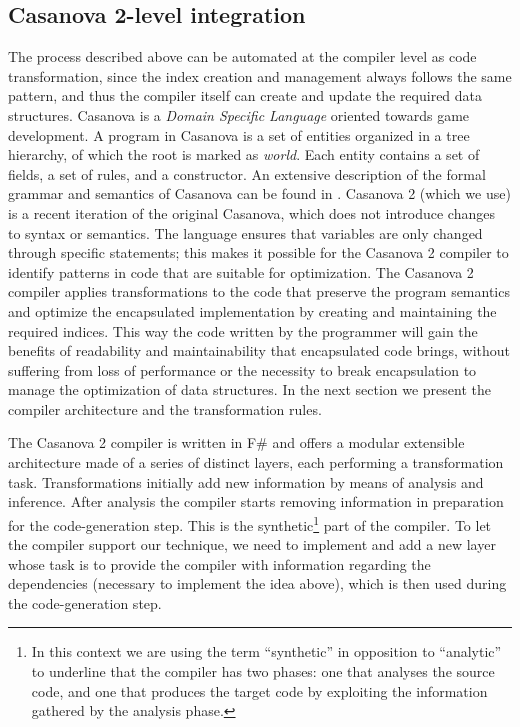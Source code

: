 \subsection{Casanova 2-level integration}

The process described above can be automated at the compiler level as code transformation, since the index creation and management always follows the same pattern, and thus the compiler itself can create and update the required data structures.
Casanova is a \textit{Domain Specific Language} oriented towards game development. A program in Casanova is a set of entities organized in a tree hierarchy, of which the root is marked as \textit{world}. Each entity contains a set of fields, a set of rules, and a constructor. An extensive description of the formal grammar and semantics of Casanova can be found in \cite{maggiore2013casanova}. Casanova 2 (which we use) is a recent iteration of the original Casanova, which does not introduce changes to syntax or semantics. The language ensures that variables are only changed through specific statements; this makes it possible for the Casanova 2 compiler to identify patterns in code that are suitable for optimization. The Casanova 2 compiler applies transformations to the code that preserve the program semantics and optimize the encapsulated implementation by creating and maintaining the required indices. This way the code written by the programmer will gain the benefits of readability and maintainability that encapsulated code brings, without suffering from loss of performance or the necessity to break encapsulation to manage the optimization of data structures. In the next section we present the compiler architecture and the transformation rules. 

The Casanova 2 compiler is written in F\# and offers a modular extensible architecture made of a series of distinct layers, each performing a transformation task. Transformations initially add new information by means of analysis and inference. After analysis the compiler starts removing information in preparation for the code-generation step. This is the synthetic\footnote{In this context we are using the term ``synthetic'' in opposition to ``analytic'' to underline that the compiler has two phases: one that analyses the source code, and one that produces the target code by exploiting the information gathered by the analysis phase.} part of the compiler. To let the compiler support our technique, we need to implement and add a new layer whose task is to provide the compiler with information regarding the dependencies (necessary to implement the idea above), which is then used during the code-generation step.